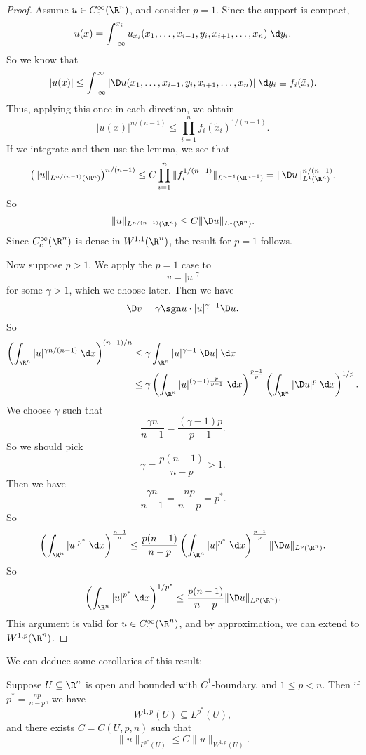 \documentclass[a4paper]{article}
\begin{document}
\begin{proof}
  Assume $u \in C_c^\infty(\R^n)$, and consider $p = 1$. Since the support is compact,
  \[
    u(x) = \int_{-\infty}^{x_i} u_{x_i}(x_1 ,\ldots, x_{i - 1}, y_i, x_{i + 1}, \ldots, x_n)\;\d y_i.
  \]
  So we know that
  \[
    |u(x)| \leq \int_{-\infty}^\infty |\D u(x_1, \ldots, x_{i - 1}, y_i, x_{i + 1}, \ldots, x_n)|\;\d y_i \equiv f_i(\tilde{x}_i).
  \]
  Thus, applying this once in each direction, we obtain
  \[
    |u(x)|^{n/(n - 1)} \leq \prod_{i = 1}^n f_i(\tilde{x}_i)^{1/(n - 1)}.
  \]
  If we integrate and then use the lemma, we see that
  \[
    \left(\|u\|_{L^{n/(n - 1)}(\R^n)}\right)^{n/(n - 1)} \leq C \prod_{i = 1}^n \|f_i^{1/(n - 1)}\|_{L^{n - 1}(\R^{n - 1})} = \|\D u\|_{L^1(\R^n)}^{n/(n-1)}.
  \]
  So
  \[
    \|u\|_{L^{n/(n-1)}(\R^n)} \leq C \|\D u\|_{L^1(\R^n)}.
  \]
  Since $C^\infty_c(\R^n)$ is dense in $W^{1, 1}(\R^n)$, the result for $p = 1$ follows.

  Now suppose $p > 1$. We apply the $p = 1$ case to
  \[
    v = |u|^\gamma
  \]
  for some $\gamma > 1$, which we choose later. Then we have
  \[
    \D v = \gamma \sgn u \cdot |u|^{\gamma - 1} \D u.
  \]
  So
  \begin{align*}
    \left(\int_{\R^n} |u|^{\gamma n/(n-1)} \;\d x\right)^{(n - 1)/n} &\leq \gamma \int_{\R^n} |u|^{\gamma - 1}|\D u|\;\d x\\
    &\leq \gamma \left(\int_{\R^n} |u|^{(\gamma - 1) \frac{p}{p - 1}}\;\d x\right)^{\frac{p - 1}{p}} \left(\int_{\R^n} |\D u|^p \;\d x\right)^{1/p}.
  \end{align*}
  We choose $\gamma$ such that
  \[
    \frac{\gamma n}{n - 1} = \frac{(\gamma - 1)p}{p - 1}.
  \]
  So we should pick
  \[
    \gamma = \frac{p(n - 1)}{n - p} > 1.
  \]
  Then we have
  \[
    \frac{\gamma n}{n - 1} = \frac{np}{n - p} = p^*.
  \]
  So
  \[
    \left(\int_{\R^n} |u|^{p^*}\;\d x\right)^{\frac{n - 1}{n}} \leq \frac{p(n - 1)}{n - p}\left(\int_{\R^n} |u|^{p^*}\;\d x \right)^{\frac{p - 1}{p}} \|\D u\|_{L^p(\R^n)}.
  \]
  So 
  \[
    \left(\int_{\R^n}|u|^{p^*}\;\d x\right)^{1/p^*} \leq \frac{p(n - 1)}{n - p} \|\D u\|_{L^p(\R^n)}.
  \]
  This argument is valid for $u \in C_c^\infty(\R^n)$, and by approximation, we can extend to $W^{1, p}(\R^n)$.
\end{proof}

We can deduce some corollaries of this result:
\begin{cor}
  Suppose $U \subseteq \R^n$ is open and bounded with $C^1$-boundary, and $1 \leq p < n$. Then if $p^* = \frac{np}{n - p}$, we have
  \[
    W^{1, p}(U) \subseteq L^{p^*}(U),
  \]
  and there exists $C = C(U, p, n)$ such that
  \[
    \|u\|_{L^{p^*}(U)} \leq C\|u\|_{W^{1, p}(U)}.
  \]
\end{cor}
\end{document}
